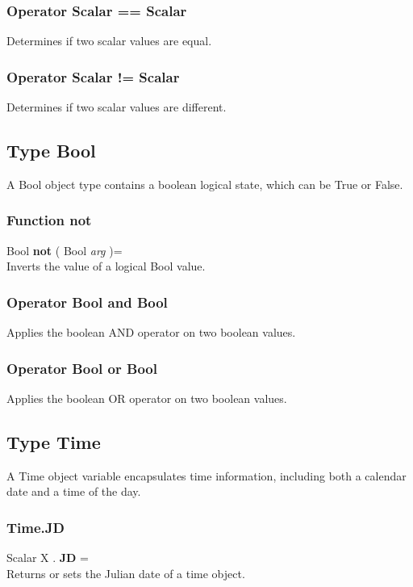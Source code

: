 \subsubsection{Operator Scalar == Scalar \label{O:Scalar==Scalar}}
Determines if two scalar values are equal.

\subsubsection{Operator Scalar != Scalar \label{O:Scalar!=Scalar}}
Determines if two scalar values are different.

\subsection{Type Bool \label{T:Bool}}
A Bool object type contains a boolean logical state, which can be True or False.

\subsubsection{Function not \label{F:not}}
Bool \textbf{not} ( Bool \textit{arg} )= \\
Inverts the value of a logical Bool value.

\subsubsection{Operator Bool  and  Bool \label{O:Bool and Bool}}
Applies the boolean AND operator on two boolean values.

\subsubsection{Operator Bool  or  Bool \label{O:Bool or Bool}}
Applies the boolean OR operator on two boolean values.

\subsection{Type Time \label{T:Time}}
A Time object variable encapsulates time information, including both a calendar date and a time of the day.

\subsubsection{Time.JD \label{F:Time:JD}}
Scalar X . \textbf{JD} = \\
Returns or sets the Julian date of a time object.

